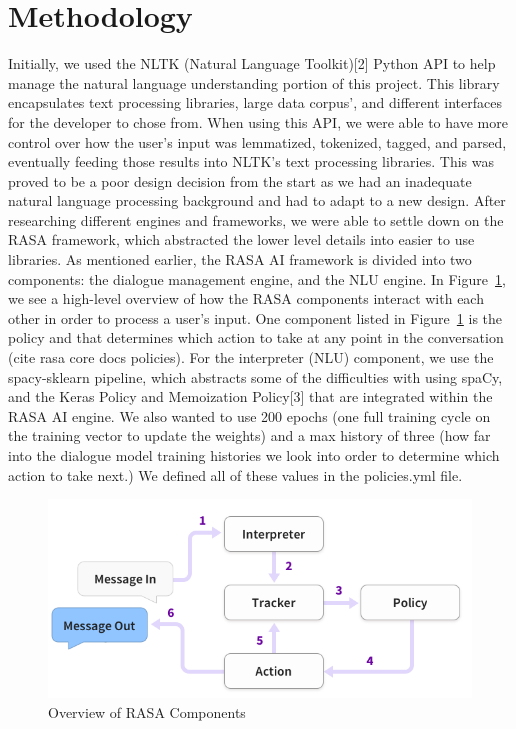 \documentclass[conference]{IEEEtran}
\begin{document}
\section*{Methodology}
Initially, we used the NLTK (Natural Language Toolkit)[2] Python API to help manage the natural language understanding portion of this project. This library encapsulates text processing libraries, large data corpus’, and different interfaces for the developer to chose from. When using this API, we were able to have more control over how the user’s input was lemmatized, tokenized, tagged, and parsed, eventually feeding those results into NLTK’s text processing libraries. This was proved to be a poor design decision from the start as we had an inadequate natural language processing background and had to adapt to a new design. After researching different engines and frameworks, we were able to settle down on the RASA framework, which abstracted the lower level details into easier to use libraries. As mentioned earlier, the RASA AI framework is divided into two components: the dialogue management engine, and the NLU engine. In Figure~\ref{fig:ex1}, we see a high-level overview of how the RASA components interact with each other in order to process a user's input. One component listed in Figure~\ref{fig:ex1} is the policy and that determines which action to take at any point in the conversation (cite rasa core docs policies). For the interpreter (NLU) component, we use the spacy-sklearn pipeline, which abstracts some of the difficulties with using spaCy, and the Keras Policy and Memoization Policy[3] that are integrated within the RASA AI engine. We also wanted to use 200 epochs (one full training cycle on the training vector to update the weights) and a max history of three (how far into the dialogue model training histories we look into order to determine which action to take next.) We defined all of these values in the policies.yml file.

\begin{figure}[!htb]
	\centering
        \includegraphics[scale=0.35]{rasa_nlu.png}
	\caption{ Overview of RASA Components }
	\label{fig:ex1}
\end{figure}
\end{document}
